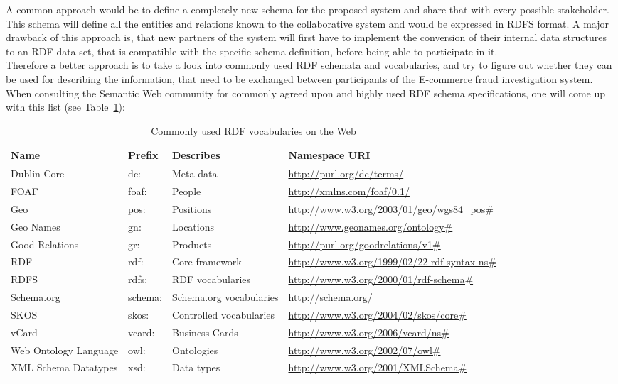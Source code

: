 A common approach would be to define a completely new schema for the proposed system and share that with every possible stakeholder. This schema will define all the entities and relations known to the collaborative system and would be expressed in \gls{RDFS} format. A major drawback of this approach is, that new partners of the system will first have to implement the conversion of their internal data structures to an \gls{RDF} data set, that is compatible with the specific schema definition, before being able to participate in it. \\

Therefore a better approach is to take a look into commonly used \gls{RDF} schemata and vocabularies, and try to figure out whether they can be used for describing the information, that need to be exchanged between participants of the \gls{E-commerce} fraud investigation system. When consulting the Semantic Web community for commonly agreed upon and highly used \gls{RDF} schema specifications, one will come up with this list (see Table~\ref{tab:used_vocab_rdf}):\@

\begin{table}[H]
\centering
\begin{tabular}{p{3cm}llp{4.5cm}}
\hline
\textbf{Name} & \textbf{Prefix} & \textbf{Describes} & \textbf{Namespace URI} \\
\hline
Dublin Core & dc: & Meta data & \url{http://purl.org/dc/terms/} \\
\hline
FOAF & foaf: & People & \url{http://xmlns.com/foaf/0.1/} \\
\hline
Geo & pos: & Positions & \url{http://www.w3.org/2003/01/geo/wgs84\_pos\#} \\
\hline
Geo Names & gn: & Locations & \url{http://www.geonames.org/ontology\#} \\
\hline
Good Relations & gr: & Products & \url{http://purl.org/goodrelations/v1\#} \\
\hline
RDF & rdf: & Core framework & \url{http://www.w3.org/1999/02/22-rdf-syntax-ns\#} \\
\hline
RDFS & rdfs: & RDF vocabularies & \url{http://www.w3.org/2000/01/rdf-schema\#} \\
\hline
Schema.org & schema: & Schema.org vocabularies & \url{http://schema.org/} \\
\hline
SKOS & skos: & Controlled vocabularies & \url{http://www.w3.org/2004/02/skos/core\#} \\
\hline
vCard & vcard: & Business Cards & \url{http://www.w3.org/2006/vcard/ns\#} \\
\hline
Web Ontology Language & owl: & Ontologies & \url{http://www.w3.org/2002/07/owl\#} \\
\hline
XML Schema Datatypes & xsd: & Data types & \url{http://www.w3.org/2001/XMLSchema\#} \\
\hline
\end{tabular}
\caption[Commonly used \gls{RDF} vocabularies on the Web]{Commonly used \gls{RDF} vocabularies on the Web \citep[pg. 41]{wood2014linked}}
\label{tab:used_vocab_rdf}
\end{table}

